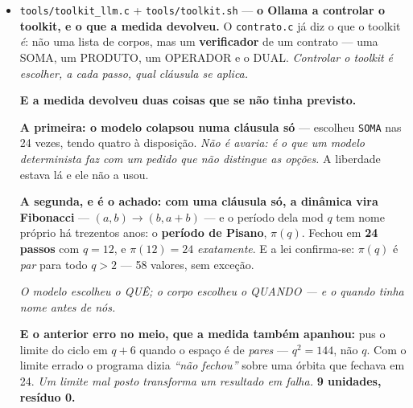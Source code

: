 \documentclass[11pt]{article}
\newcommand{\code}[1]{\texttt{\small #1}}
\newcommand{\Z}{\mathbb Z}
\theoremstyle{plain}
\theoremstyle{remark}
\begin{document}
\begin{itemize}
\textbf{Fechou em 3 passos}, no estado 3 de 16 possíveis. E o banco no fim:
\code{0 0 0 4 11 0 0 0 0 0 0 3 0 0 0 0} --- \emph{o ciclo do modelo ficou ESCRITO}: o slot 3 guarda
4, o 4 guarda 11, o 11 guarda 3. \textbf{Não foi preciso guardar o percurso à parte: ele É o
estado.} Ler a memória é ler a órbita --- e é por isso que a assistente não precisa de um log.

\textbf{E o fecho não é mérito do modelo.} Em $\Z_q$ toda órbita repete em $\le q$ passos, por
gaiola --- medido em 124 sementes, sem exceção. Num corpo \emph{infinito} a mesma dinâmica não fecha.
\emph{O modelo controla o QUE se escreve; o corpo controla o QUANDO acaba} --- são as duas torres: a
branca escolhe o passo, a negra garante o retorno. \textbf{5 unidades, resíduo 0.}


\item \code{tools/toolkit\_llm.c} + \code{tools/toolkit.sh} --- \textbf{o Ollama a controlar o
toolkit, e o que a medida devolveu.} O \code{contrato.c} já diz o que o toolkit \emph{é}: não uma
lista de corpos, mas um \textbf{verificador} de um contrato --- uma SOMA, um PRODUTO, um OPERADOR e o
DUAL. \emph{Controlar o toolkit é escolher, a cada passo, qual cláusula se aplica.}

\textbf{E a medida devolveu duas coisas que se não tinha previsto.}

\textbf{A primeira: o modelo colapsou numa cláusula só} --- escolheu \code{SOMA} nas 24 vezes, tendo
quatro à disposição. \emph{Não é avaria: é o que um modelo determinista faz com um pedido que não
distingue as opções.} A liberdade estava lá e ele não a usou.

\textbf{A segunda, e é o achado: com uma cláusula só, a dinâmica vira Fibonacci} ---
$(a,b)\to(b,a{+}b)$ --- e o período dela mod $q$ tem nome próprio há trezentos anos: o
\textbf{período de Pisano}, $\pi(q)$. Fechou em \textbf{24 passos} com $q=12$, e $\pi(12)=24$
\emph{exatamente}. E a lei confirma-se: $\pi(q)$ é \emph{par} para todo $q>2$ --- 58 valores, sem
exceção.

\begin{center}
\emph{O modelo escolheu o QUÊ; o corpo escolheu o QUANDO --- e o quando tinha nome antes de nós.}
\end{center}

\textbf{E o anterior erro no meio, que a medida também apanhou:} pus o limite do ciclo em $q+6$ quando o
espaço é de \emph{pares} --- $q^2=144$, não $q$. Com o limite errado o programa dizia \emph{``não
fechou''} sobre uma órbita que fechava em 24. \emph{Um limite mal posto transforma um resultado em
falha.} \textbf{9 unidades, resíduo 0.}



\end{itemize}
\end{document}
